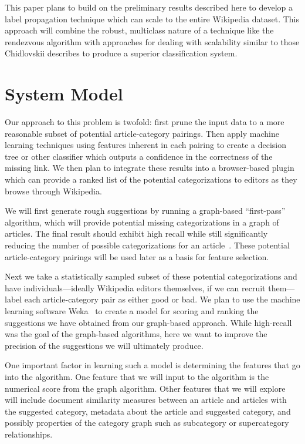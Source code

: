 \documentclass{sig-alternate}
\begin{document}
This paper plans to build on the preliminary results described here to develop a label propagation technique which can scale to the entire Wikipedia dataset. This approach will combine the robust, multiclass nature of a technique like the rendezvous algorithm with approaches for dealing with scalability similar to those Chidlovskii describes to produce a superior classification system.

\section{System Model}
\label{sec:system_model}
Our approach to this problem is twofold: first prune the input data to a more reasonable subset of potential article-category pairings. Then apply machine learning techniques using features inherent in each pairing to create a decision tree or other classifier which outputs a confidence in the correctness of the missing link. We then plan to integrate these results into a browser-based plugin which can provide a ranked list of the potential categorizations to editors as they browse through Wikipedia.

We will first generate rough suggestions by running a graph-based ``first-pass'' algorithm, which will provide potential missing categorizations in a graph of articles. The final result should exhibit high recall while still significantly reducing the number of possible categorizations for an article~\cite{Avrachenkov}. These potential article-category pairings will be used later as a basis for feature selection.

Next we take a statistically sampled subset of these potential categorizations and have individuals---ideally Wikipedia editors themselves, if we can recruit them---label each article-category pair as either good or bad. We plan to use the machine learning software Weka~\cite{Weka} to create a model for scoring and ranking the suggestions we have obtained from our graph-based approach. While high-recall was the goal of the graph-based algorithms, here we want to improve the precision of the suggestions we will ultimately produce. 

One important factor in learning such a model is determining the features that go into the algorithm. One feature that we will input to the algorithm is the numerical score from the graph algorithm. Other features that we will explore will include document similarity measures between an article and articles with the suggested category, metadata about the article and suggested category, and possibly properties of the category graph such as subcategory or supercategory relationships.
\end{document}
